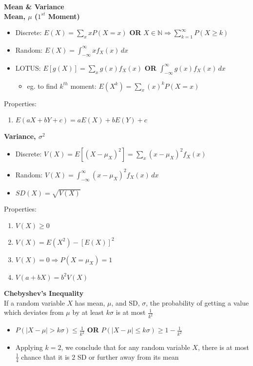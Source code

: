 \documentclass[a4paper, 12pt]{article}
\begin{document}
\begin{multicols*}{3}
{\small\textbf{Mean \& Variance}} \\
\textbf{Mean, $\mu$ ($1^{st}$ Moment)}
\begin{itemize}
    \item Discrete: $E(X) = \sum_{x} xP(X = x)$ \textbf{OR} $X \in \mathbb{N} \Rightarrow \sum_{k=1}^{\infty}P(X \geq k)$
    \item Random: $E(X) = \int_{-\infty}^{\infty} xf_X(x) \, dx$
    \item LOTUS: $E[g(X)] = \sum_x g(x) f_X(x)$ \textbf{OR} $\int_{-\infty}^{\infty}g(x)f_X(x) \, dx$ 
    \begin{itemize}
        \item eg. to find $k^{th}$ moment: $E(X^k) = \sum_{x} (x)^kP(X = x)$
    \end{itemize}
\end{itemize}
Properties:
\begin{enumerate}
    \item $E(aX + bY +c) = aE(X) + bE(Y) + c$
\end{enumerate}
\textbf{Variance, $\sigma^2$}
\begin{itemize}
    \item Discrete: $V(X) = E[(X - \mu_X)^2] = \sum_x (x - \mu_X)^2f_X(x)$
    \item Random: $V(X) = \int_{-\infty}^{\infty}(x - \mu_X)^2f_X(x) \, dx$
    \item $SD(X) = \sqrt{V(X)}$
\end{itemize}
Properties:
\begin{enumerate}
    \item $V(X) \geq 0$
    \item $V(X) = E(X^2) - [E(X)]^2$
    \item $V(X) = 0 \Rightarrow P(X = \mu_X) = 1$
    \item $V(a + bX) = b^2V(X)$
\end{enumerate}
\textbf{Chebyshev's Inequality} \\
If a random variable $X$ has mean, $\mu$, and SD, $\sigma$, the probability of
getting a value which deviates from $\mu$ by at least $k\sigma$ is at most $\frac{1}{k^2}$
\begin{itemize}
    \item $P(|X - \mu| > k\sigma) \leq \frac{1}{k^2}$ \textbf{OR} $P(|X - \mu| \leq k\sigma) \geq 1 - \frac{1}{k^2}$
    \item Applying $k = 2$, we conclude that for any random variable $X$, there is at
    most $\frac{1}{4}$ chance that it is $2$ SD or further away
    from its mean
\end{itemize}


\end{multicols*}
\end{document}
